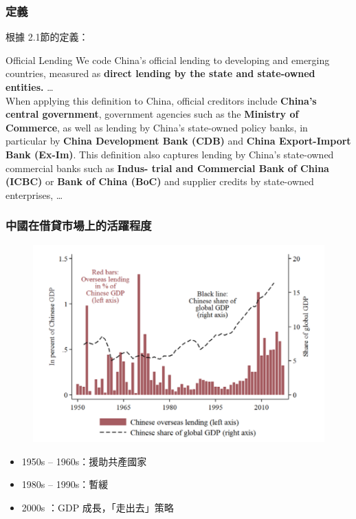 \begin{frame}
    \frametitle{定義}

    根據 \citet*{Horn-Reinhart-Trebesch-21} 2.1節的定義：
    \begin{block}{Official Lending}
        \small
        We code China's official lending to developing and emerging countries, measured as \textbf{direct lending by the state and state-owned entities.}
        \dots \\
        When applying this definition to China, official creditors include \textbf{China's central government}, government agencies such as the
\textbf{Ministry of Commerce}, as well as lending by China's state-owned policy banks, in particular by \textbf{China Development Bank (CDB)} and
\textbf{China Export-Import Bank (Ex-Im)}. This definition also captures lending by China's state-owned commercial banks such as \textbf{Indus-
trial and Commercial Bank of China (ICBC)} or \textbf{Bank of China (BoC)} and supplier credits by state-owned enterprises, \dots
    \end{block}

\end{frame}

\begin{frame}
    \frametitle{中國在借貸市場上的活躍程度}
    \begin{figure}
        \includegraphics[width = \textwidth]{fig/fig4.png}
    \end{figure}
\end{frame}

\begin{frame}
    \begin{itemize}
        \item 1950s -- 1960s：援助共產國家
        \item 1980s -- 1990s：暫緩
        \item 2000s ：GDP 成長，「走出去」策略
    \end{itemize}
\end{frame}

